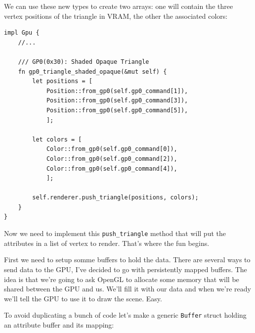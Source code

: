 \documentclass[a4paper]{article}
\newcommand{\code}[1] {\texttt{#1}}
\begin{document}
We can use these new types to create two arrays: one will contain the
three vertex positions of the triangle in VRAM, the other the
associated colors:

\begin{lstlisting}
impl Gpu {
    //...

    /// GP0(0x30): Shaded Opaque Triangle
    fn gp0_triangle_shaded_opaque(&mut self) {
        let positions = [
            Position::from_gp0(self.gp0_command[1]),
            Position::from_gp0(self.gp0_command[3]),
            Position::from_gp0(self.gp0_command[5]),
            ];

        let colors = [
            Color::from_gp0(self.gp0_command[0]),
            Color::from_gp0(self.gp0_command[2]),
            Color::from_gp0(self.gp0_command[4]),
            ];

        self.renderer.push_triangle(positions, colors);
    }
}
\end{lstlisting}

Now we need to implement this \code{push\_triangle} method that will
put the attributes in a list of vertex to render. That's where the fun
begins.

First we need to setup somme buffers to hold the data. There are
several ways to send data to the GPU, I've decided to go with
persistently mapped buffers. The idea is that we're going to ask
OpenGL to allocate some memory that will be shared between the GPU and
us. We'll fill it with our data and when we're ready we'll tell the
GPU to use it to draw the scene. Easy.

To avoid duplicating a bunch of code let's make a generic
\code{Buffer} struct holding an attribute buffer and its mapping:
\end{document}
